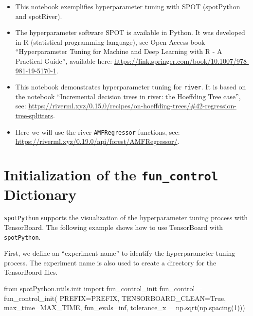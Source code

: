 \documentclass[
  letterpaper,
  DIV=11,
  numbers=noendperiod]{scrreprt}
\newenvironment{Shaded}{\begin{snugshade}}{\end{snugshade}}
\newcommand{\DecValTok}[1]{\textcolor[rgb]{0.68,0.00,0.00}{#1}}
\newcommand{\ImportTok}[1]{\textcolor[rgb]{0.00,0.46,0.62}{#1}}
\newcommand{\NormalTok}[1]{\textcolor[rgb]{0.00,0.23,0.31}{#1}}
\newcommand{\OperatorTok}[1]{\textcolor[rgb]{0.37,0.37,0.37}{#1}}
\newcommand{\VariableTok}[1]{\textcolor[rgb]{0.07,0.07,0.07}{#1}}
\providecommand{\tightlist}{%
  \setlength{\itemsep}{0pt}\setlength{\parskip}{0pt}}\usepackage{longtable,booktabs,array}
\begin{document}
\begin{itemize}
\tightlist
\item
  This notebook exemplifies hyperparameter tuning with SPOT (spotPython
  and spotRiver).
\item
  The hyperparameter software SPOT is available in Python. It was
  developed in R (statistical programming language), see Open Access
  book ``Hyperparameter Tuning for Machine and Deep Learning with R - A
  Practical Guide'', available here:
  \url{https://link.springer.com/book/10.1007/978-981-19-5170-1}.
\item
  This notebook demonstrates hyperparameter tuning for \texttt{river}.
  It is based on the notebook ``Incremental decision trees in river: the
  Hoeffding Tree case'', see:
  \url{https://riverml.xyz/0.15.0/recipes/on-hoeffding-trees/\#42-regression-tree-splitters}.
\item
  Here we will use the river \texttt{AMFRegressor} functions, see:
  \url{https://riverml.xyz/0.19.0/api/forest/AMFRegressor/}.
\end{itemize}

\section{\texorpdfstring{Initialization of the \texttt{fun\_control}
Dictionary}{Initialization of the fun\_control Dictionary}}\label{initialization-of-the-fun_control-dictionary}

\texttt{spotPython} supports the visualization of the hyperparameter
tuning process with TensorBoard. The following example shows how to use
TensorBoard with \texttt{spotPython}.

First, we define an ``experiment name'' to identify the hyperparameter
tuning process. The experiment name is also used to create a directory
for the TensorBoard files.

\begin{Shaded}
\begin{Highlighting}[]
\ImportTok{from}\NormalTok{ spotPython.utils.init }\ImportTok{import}\NormalTok{ fun\_control\_init}
\NormalTok{fun\_control }\OperatorTok{=}\NormalTok{ fun\_control\_init(}
\NormalTok{    PREFIX}\OperatorTok{=}\NormalTok{PREFIX,}
\NormalTok{    TENSORBOARD\_CLEAN}\OperatorTok{=}\VariableTok{True}\NormalTok{,}
\NormalTok{    max\_time}\OperatorTok{=}\NormalTok{MAX\_TIME,}
\NormalTok{    fun\_evals}\OperatorTok{=}\NormalTok{inf,}
\NormalTok{    tolerance\_x }\OperatorTok{=}\NormalTok{ np.sqrt(np.spacing(}\DecValTok{1}\NormalTok{)))}
\end{Highlighting}
\end{Shaded}
\end{document}
